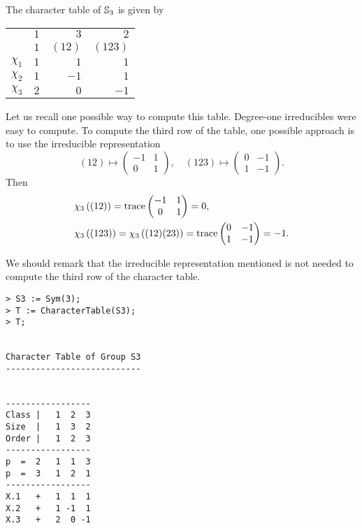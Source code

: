 \begin{example}
	The character table of $\mathbb{S}_3$ is given by 
	\begin{center}
		\begin{tabular}{|c|rrr|}
			\hline
			& $1$ & $3$ & $2$\tabularnewline
			& $1$ & $(12)$ & $(123)$ \tabularnewline
			\hline 
			$\chi_{1}$ & $1$ & $1$ & $1$\tabularnewline
			$\chi_{2}$ & $1$ & $-1$ & $1$ \tabularnewline
			$\chi_{3}$ & $2$ & $0$ & $-1$ \tabularnewline
			\hline
		\end{tabular}
	\end{center}
	Let us recall one possible way to compute this table. 
	Degree-one irreducibles were easy to compute. 
	To compute the third row of the table, one possible approach is to use
	the irreducible representation  
	\[
	(12)\mapsto \begin{pmatrix}-1&1\\0&1\end{pmatrix},
	\quad
	(123)\mapsto \begin{pmatrix}0&-1\\1&-1\end{pmatrix}.
	\]
    Then	
    \begin{align*}
		&\chi_3\left( (12) \right)=\operatorname{trace}\begin{pmatrix}-1&1\\0&1\end{pmatrix}=0,\\
		&\chi_3\left( (123) \right)=\chi_3\left( (12)(23)\right)=\operatorname{trace}\begin{pmatrix}0&-1\\1&-1\end{pmatrix}=-1.
	\end{align*}

	We should remark that the irreducible representation 
	mentioned is not needed to
	compute the third row of the character table. 
\begin{lstlisting}
> S3 := Sym(3);
> T := CharacterTable(S3);
> T;


Character Table of Group S3
---------------------------


-----------------
Class |   1  2  3
Size  |   1  3  2
Order |   1  2  3
-----------------
p  =  2   1  1  3
p  =  3   1  2  1
-----------------
X.1   +   1  1  1
X.2   +   1 -1  1
X.3   +   2  0 -1    
\end{lstlisting}


\end{example}
